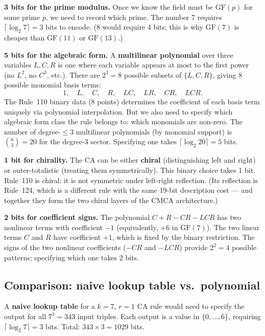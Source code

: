 \documentclass[11pt,a4paper]{article}
\newcommand{\term}[1]{\textbf{#1}}
\theoremstyle{definition}
\begin{document}
\medskip
\textbf{3 bits for the prime modulus.}
Once we know the field must be $\mathrm{GF}(p)$ for some prime $p$, we need
to record which prime.  The number 7 requires $\lceil\log_2 7\rceil = 3$
bits to encode.  (8 would require 4 bits; this is why $\mathrm{GF}(7)$ is
cheaper than $\mathrm{GF}(11)$ or $\mathrm{GF}(13)$.)

\medskip
\textbf{5 bits for the algebraic form.}
A \term{multilinear polynomial} over three variables $L, C, R$ is one where
each variable appears at most to the first power (no $L^2$, no $C^3$, etc.).
There are $2^3 = 8$ possible subsets of $\{L, C, R\}$, giving 8 possible
monomial basis terms:
\[
  1, \quad L, \quad C, \quad R, \quad LC, \quad LR, \quad CR, \quad LCR.
\]
The Rule~110 binary data (8 points) determines the coefficient of each
basis term uniquely via polynomial interpolation.  But we also need to
specify which algebraic form class the rule belongs to: which monomials
are non-zero.  The number of degree-$\leq 3$ multilinear polynomials (by
monomial support) is $\binom{6}{3} = 20$ for the degree-3 sector.
Specifying one takes $\lceil\log_2 20\rceil = 5$ bits.

\medskip
\textbf{1 bit for chirality.}
The CA can be either \term{chiral} (distinguishing left and right) or
outer-totalistic (treating them symmetrically).  This binary choice takes 1
bit.  Rule~110 is chiral: it is not symmetric under left-right reflection.
(Its reflection is Rule~124, which is a different rule with the same 19-bit
description cost — and together they form the two chiral layers of the CMCA
architecture.)

\medskip
\textbf{2 bits for coefficient signs.}
The polynomial $C + R - CR - LCR$ has two nonlinear terms with coefficient
$-1$ (equivalently, $+6$ in $\mathrm{GF}(7)$).  The two linear terms $C$
and $R$ have coefficient $+1$, which is fixed by the binary restriction.
The signs of the two nonlinear coefficients ($-CR$ and $-LCR$) provide
$2^2 = 4$ possible patterns; specifying which one takes 2 bits.

\subsection{Comparison: naive lookup table vs.\ polynomial}

A \term{naive lookup table} for a $k=7$, $r=1$ CA rule would need to
specify the output for all $7^3 = 343$ input triples.  Each output is a
value in $\{0,\ldots,6\}$, requiring $\lceil\log_2 7\rceil = 3$ bits.
Total: $343 \times 3 = 1029$ bits.
\end{document}
